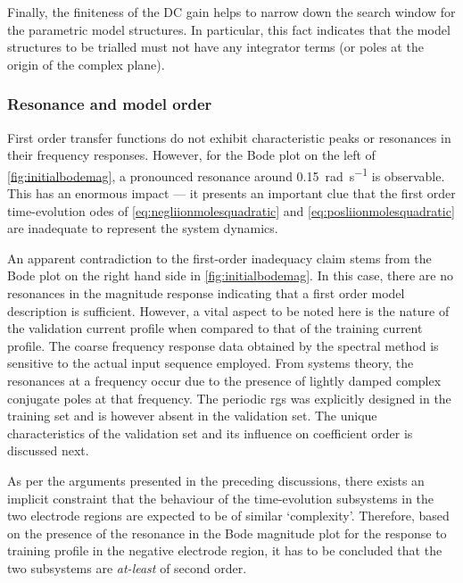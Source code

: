 Finally, the finiteness  of the DC gain  helps to narrow down  the search window
for the parametric model structures. In particular, this fact indicates that the
model structures to be trialled must not  have any integrator terms (or poles at
the origin of the complex plane).

\subsubsection*{Resonance and model order}

First  order  transfer   functions  do  not  exhibit   characteristic  peaks  or
resonances  in  their  frequency  responses.  However,  for  the  Bode  plot  on
the   left   of \cref{fig:initialbodemag},   a   pronounced   resonance   around
\SI{0.15}{\radian\per\second} is observable. This has  an enormous impact --- it
presents  an important  clue  that the  first  order time-evolution  \glspl{ode}
of \cref{eq:negliionmolesquadratic}   and \cref{eq:posliionmolesquadratic}   are
inadequate to represent the system dynamics.

An apparent  contradiction to  the first-order inadequacy  claim stems  from the
Bode plot  on the  right hand side  in \cref{fig:initialbodemag}. In  this case,
there are no resonances in the  magnitude response indicating that a first order
model description is sufficient. However, a vital aspect to be noted here is the
nature of the  validation current profile when compared to  that of the training
current profile.  The coarse  frequency response data  obtained by  the spectral
method is sensitive to the actual  input sequence employed. From systems theory,
the  resonances at  a frequency  occur  due to  the presence  of lightly  damped
complex conjugate poles at that frequency. The periodic \gls{rgs} was explicitly
designed in the  training set and is  however absent in the  validation set. The
unique characteristics  of the validation  set and its influence  on coefficient
order is discussed next.

As per  the arguments presented  in the  preceding discussions, there  exists an
implicit constraint that  the behaviour of the time-evolution  subsystems in the
two electrode  regions are  expected to be  of similar  `complexity'. Therefore,
based  on the  presence of  the resonance  in the  Bode magnitude  plot for  the
response to  training profile  in the  negative electrode region,  it has  to be
concluded that the two subsystems are \emph{at-least} of second order.

